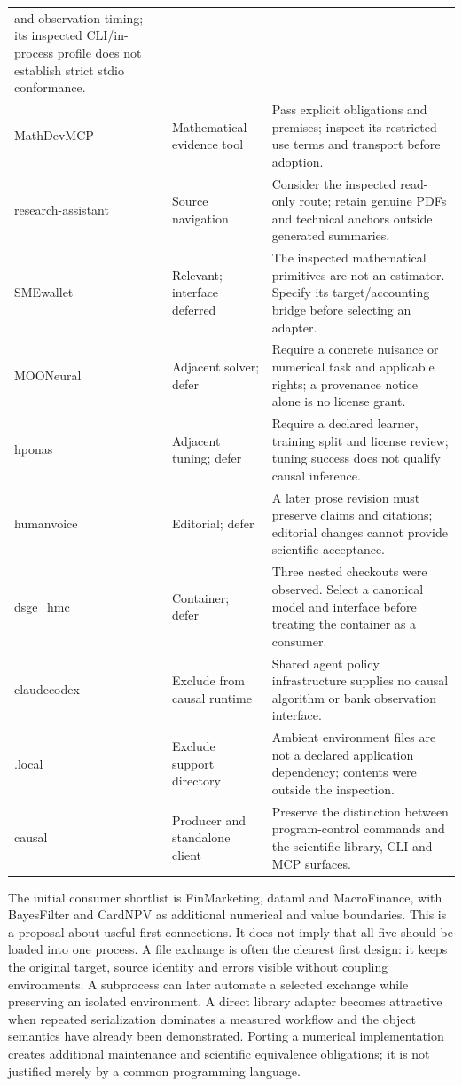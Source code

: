 \begin{longtable}{p{.21\linewidth}p{.23\linewidth}p{.47\linewidth}}
and observation timing; its inspected CLI/in-process profile does not establish
strict stdio conformance. \\
MathDevMCP & Mathematical evidence tool & Pass explicit obligations and
premises; inspect its restricted-use terms and transport before adoption. \\
research-assistant & Source navigation & Consider the inspected read-only
route; retain genuine PDFs and technical anchors outside generated summaries. \\
SMEwallet & Relevant; interface deferred & The inspected mathematical
primitives are not an estimator. Specify its target/accounting bridge before
selecting an adapter. \\
MOONeural & Adjacent solver; defer & Require a concrete nuisance or numerical
task and applicable rights; a provenance notice alone is no license grant. \\
hponas & Adjacent tuning; defer & Require a declared learner, training split
and license review; tuning success does not qualify causal inference. \\
humanvoice & Editorial; defer & A later prose revision must preserve claims
and citations; editorial changes cannot provide scientific acceptance. \\
dsge\_hmc & Container; defer & Three nested checkouts were observed. Select a
canonical model and interface before treating the container as a consumer. \\
claudecodex & Exclude from causal runtime & Shared agent policy infrastructure
supplies no causal algorithm or bank observation interface. \\
.local & Exclude support directory & Ambient environment files are not a
declared application dependency; contents were outside the inspection. \\
causal & Producer and standalone client & Preserve the distinction between
program-control commands and the scientific library, CLI and MCP surfaces. \\
\bottomrule
\end{longtable}

The initial consumer shortlist is FinMarketing, dataml and MacroFinance,
with BayesFilter and CardNPV as additional numerical and value boundaries.
This is a proposal about useful first connections. It does not imply that all
five should be loaded into one process. A file exchange is often the clearest
first design: it keeps the original target, source identity and errors visible
without coupling environments. A subprocess can later automate a selected
exchange while preserving an isolated environment. A direct library adapter
becomes attractive when repeated serialization dominates a measured workflow
and the object semantics have already been demonstrated. Porting a numerical
implementation creates additional maintenance and scientific equivalence
obligations; it is not justified merely by a common programming language.

